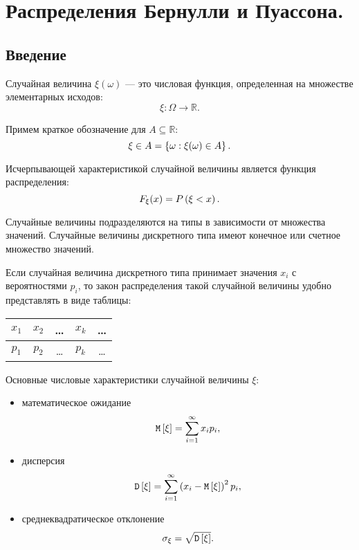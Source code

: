 \chapter{Распределения Бернулли и Пуассона.}

\section*{Введение}

Случайная величина $\xi(\omega)$ --- это числовая функция, определенная на множестве элементарных исходов:
\begin{equation}
    \xi : \Omega \rightarrow \mathbb{R}.
\end{equation}

Примем краткое обозначение для $A \subseteq \mathbb{R}$:
\begin{equation}
    \xi \in A = \left \{ \omega : \xi(\omega) \in A \right \}.
\end{equation}

Исчерпывающей характеристикой случайной величины является функция распределения:
\begin{equation}
    F_\xi(x) = P \left ( \xi < x \right ).
\end{equation}

Случайные величины подразделяются на типы в зависимости от множества значений. Случайные величины дискретного типа имеют конечное или счетное множество значений.

Если случайная величина дискретного типа принимает значения $x_i$ с вероятностями $p_i$, то закон распределения такой случайной величины удобно представлять в виде таблицы:
\begin{center}
    \begin{tabular}{|c|c|c|c|c|}
        \hline
        $x_1$ & $x_2$ & \dots & $x_k$ & \dots \\
        \hline
        $p_1$ & $p_2$ & \dots & $p_k$ & \dots \\
        \hline
    \end{tabular}
\end{center}

Основные числовые характеристики случайной величины $\xi$:
\begin{itemize}
    \item математическое ожидание
    \begin{equation}
        \mathtt{M} \left [ \xi \right ] = \sum_{i=1}^{\infty} x_i p_i ,
    \end{equation}
    \item дисперсия
    \begin{equation}
        \mathtt{D} \left [ \xi \right ] = \sum_{i=1}^{\infty} \left ( x_i - \mathtt{M} \left [ \xi \right ] \right )^2 p_i ,
    \end{equation}
    \item среднеквадратическое отклонение
    \begin{equation}
        \sigma_\xi = \sqrt{\mathtt{D} \left [ \xi \right ]} .
    \end{equation}
\end{itemize}

